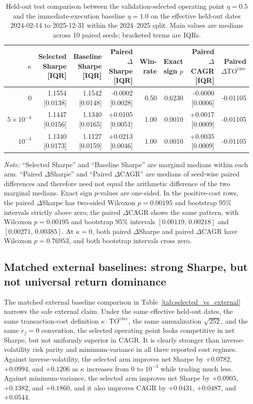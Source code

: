 \documentclass[10pt,twocolumn]{article}
\newcommand{\TOexec}{\mathrm{TO}^{\mathrm{exec}}}
\newcommand{\kappaTC}{\kappa}
\begin{document}
\begin{table}[t]
\centering
\scriptsize
\caption{Held-out test comparison between the validation-selected operating point $\eta=0.5$ and the immediate-execution baseline $\eta=1.0$ on the effective held-out dates 2024-02-14 to 2025-12-31 within the 2024--2025 split. Main values are medians across 10 paired seeds; bracketed terms are IQRs.}
\label{tab:selected_vs_eta1}
\begin{tabular}{@{}rrrrrrrr@{}}
\toprule
$\kappaTC$ & Selected Sharpe [IQR] & Baseline Sharpe [IQR] & Paired $\Delta$Sharpe [IQR] & Win-rate & Exact sign $p$ & Paired $\Delta$CAGR [IQR] & Paired $\Delta\overline{\TOexec}$ \\
\midrule
$0$ & 1.1554 [0.0138] & 1.1542 [0.0148] & -0.0002 [0.0028] & 0.50 & 0.6230 & -0.0000 [0.0006] & -0.01105 \\
$5\times10^{-4}$ & 1.1447 [0.0156] & 1.1340 [0.0165] & +0.0105 [0.0051] & 1.00 & 0.0010 & +0.0017 [0.0009] & -0.01105 \\
$10^{-3}$ & 1.1340 [0.0173] & 1.1127 [0.0159] & +0.0213 [0.0046] & 1.00 & 0.0010 & +0.0035 [0.0009] & -0.01105 \\
\bottomrule
\end{tabular}
\par\vspace{2pt}\raggedright\footnotesize{\textit{Note:} ``Selected Sharpe'' and ``Baseline Sharpe'' are marginal medians within each arm. ``Paired $\Delta$Sharpe'' and ``Paired $\Delta$CAGR'' are medians of seed-wise paired differences and therefore need not equal the arithmetic difference of the two marginal medians. Exact sign $p$-values are one-sided. In the positive-cost rows, the paired $\Delta$Sharpe has two-sided Wilcoxon $p=0.00195$ and bootstrap $95\%$ intervals strictly above zero; the paired $\Delta$CAGR shows the same pattern, with Wilcoxon $p=0.00195$ and bootstrap $95\%$ intervals $[0.00119,\,0.00218]$ and $[0.00271,\,0.00385]$. At $\kappaTC=0$, both paired $\Delta$Sharpe and paired $\Delta$CAGR have Wilcoxon $p=0.76953$, and both bootstrap intervals cross zero.}
\end{table}

\subsection{Matched external baselines: strong Sharpe, but not universal return dominance}
The matched external baseline comparison in Table~\ref{tab:selected_vs_external} narrows the safe external claim. Under the same effective held-out dates, the same transaction-cost definition $\kappaTC\cdot\TOexec$, the same annualization $\sqrt{252}$, and the same $r_f=0$ convention, the selected operating point looks competitive in net Sharpe, but not uniformly superior in CAGR. It is clearly stronger than inverse-volatility risk parity and minimum-variance in all three reported cost regimes. Against inverse-volatility, the selected arm improves net Sharpe by $+0.0782$, $+0.0994$, and $+0.1206$ as $\kappaTC$ increases from $0$ to $10^{-3}$ while trading much less. Against minimum-variance, the selected arm improves net Sharpe by $+0.0905$, $+0.1382$, and $+0.1860$, and it also improves CAGR by $+0.0431$, $+0.0487$, and $+0.0544$.
\end{document}
